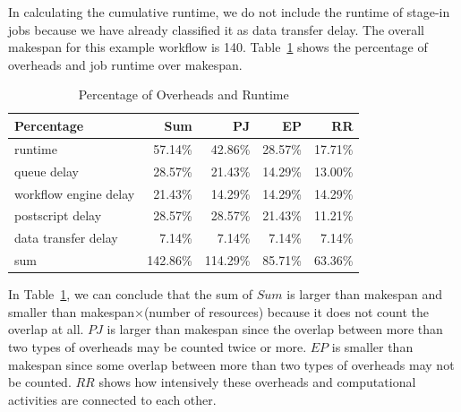 
In calculating the cumulative runtime, we do not include the runtime of stage-in jobs because we have already classified it as data transfer delay. The overall makespan for this example workflow is 140. Table~\ref{tab:model_percentage_overhead} shows the percentage of overheads and job runtime over makespan.  

\begin{table}[h!]
\caption{Percentage of Overheads and Runtime}
\label{tab:model_percentage_overhead}
\centering
\begin{tabular}{lrrrr}
\hline
Percentage & Sum & PJ & EP &RR\\

\hline

runtime & 57.14\% & 42.86\% & 28.57\% &17.71\% \\
queue delay & 28.57\% &21.43\% &14.29\% &13.00\% \\
workflow engine delay & 21.43\% &14.29\%& 14.29\% &14.29\%\\
postscript delay & 28.57\% & 28.57\% & 21.43\% & 11.21\% \\
data transfer delay & 7.14\% & 7.14\% & 7.14\% & 7.14\% \\
sum & 142.86\% & 114.29\% & 85.71\% & 63.36\%\\
\hline
\end{tabular}
\end{table} 


In Table~\ref{tab:model_percentage_overhead}, we can conclude that the sum of $Sum$ is larger than makespan and smaller than makespan$\times$(number of resources) because it does not count the overlap at all. $PJ$ is larger than makespan since the overlap between more than two types of overheads may be counted twice or more. $EP$ is smaller than makespan since some overlap between more than two types of overheads may not be counted.  $RR$ shows how intensively these overheads and computational activities are connected to each other. 


